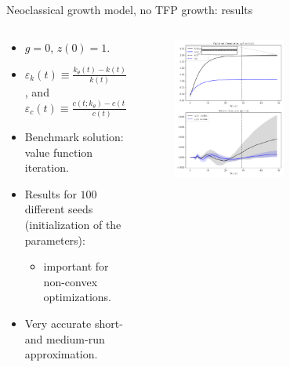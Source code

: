 \documentclass[aspectratio=169,10pt]{beamer}
\begin{document}
\begin{frame}{Neoclassical growth model, no TFP growth: results}
	\begin{columns}
		\begin{column}{0.4\textwidth}
			\begin{itemize}
				\item $g=0$, $z(0)=1$.
				\vspace{0.05in}
				\item $\varepsilon_k(t)\equiv \frac{k_\theta(t)-k(t)}{k(t)}$, and  $\varepsilon_c(t)\equiv \frac{c(t;k_\theta)-c(t)}{c(t)}$ 
				\vspace{0.05in}
				\item Benchmark solution: value function iteration.
				\vspace{0.05in}
				\item Results for $100$ different seeds (initialization of the parameters):
				\begin{itemize}
					\item important for non-convex optimizations.
				\end{itemize} 
				\vspace{0.05in}
				\item Very accurate short- and medium-run approximation.
			\end{itemize}
		\end{column}
		\begin{column}{0.7\textwidth}
			\begin{figure}[t!]
				\centering
				\includegraphics[width=0.56\textwidth]{figs/growth_sequential_g0.pdf}
				\vspace{-7mm}
			\end{figure}
		\end{column}
	\end{columns}
\end{frame}
\end{document}
